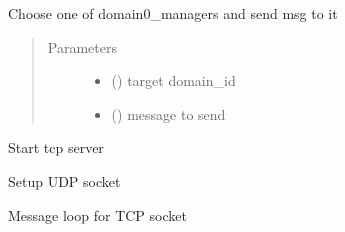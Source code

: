 \documentclass[letterpaper,10pt,english]{sphinxmanual}
\begin{document}
\begin{fulllineitems}
\begin{fulllineitems}
\label{\detokenize{bbc1.core.bbc_network:bbc1.core.bbc_network.BBcNetwork.send_message_to_a_domain0_manager}}
Choose one of domain0\_managers and send msg to it
\begin{quote}\begin{description}
\item[{Parameters}] \leavevmode\begin{itemize}
\item {} 
 () \textendash{} target domain\_id

\item {} 
 () \textendash{} message to send

\end{itemize}

\end{description}\end{quote}

\end{fulllineitems}


\begin{fulllineitems}
\label{\detokenize{bbc1.core.bbc_network:bbc1.core.bbc_network.BBcNetwork.setup_tcp_server}}
Start tcp server

\end{fulllineitems}


\begin{fulllineitems}
\label{\detokenize{bbc1.core.bbc_network:bbc1.core.bbc_network.BBcNetwork.setup_udp_socket}}
Setup UDP socket

\end{fulllineitems}


\begin{fulllineitems}
\label{\detokenize{bbc1.core.bbc_network:bbc1.core.bbc_network.BBcNetwork.tcpserver_loop}}
Message loop for TCP socket


\end{fulllineitems}
\end{fulllineitems}
\end{document}
